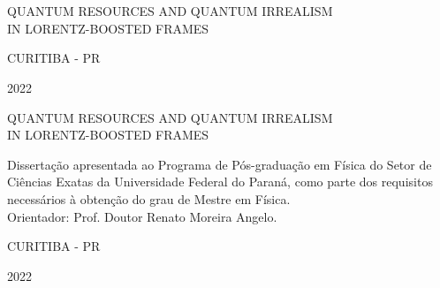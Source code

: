 \documentclass[12pt,a4paper,notitlepage]{report}
\begin{document}
\newcommand{\be}{\begin{eqnarray}}
\newcommand{\ee}{\end{eqnarray}}
\newcommand{\eq}[1]{\begin{align}#1\end{align}}
\newcommand{\Unit}{\mathbb{1}}
\newcommand{\Hop}{\mathcal{H}}
\newcommand{\sinc}{\mbox{ sinc}}
\newcommand{\overbar}[1]{\mkern 1.5mu\overline{\mkern-1.5mu#1\mkern-1.5mu}\mkern 1.5mu}

\begin{titlepage} %
\begin{center}
\vspace{2cm}
\\[.5cm]

\vspace{4cm}

\\[2cm]

\vspace{3.5cm}

QUANTUM RESOURCES AND QUANTUM IRREALISM \\[.2cm]
IN LORENTZ-BOOSTED FRAMES
\\[2.5cm]

\hfill

\vfill

CURITIBA - PR

2022

\end{center}
\end{titlepage}

\begin{titlepage} %
\begin{center}

\vspace{4cm}


\vspace{7cm}

QUANTUM RESOURCES AND QUANTUM IRREALISM \\[.2cm]
IN LORENTZ-BOOSTED FRAMES
\\[2.5cm]

\vspace{2cm}

\hspace{.45\textwidth} %
\begin{minipage}{.5\textwidth}
{\footnotesize Dissertação apresentada ao Programa de Pós-graduação em Física do 
Setor de Ciências Exatas da Universidade Federal do Paraná, 
como parte dos requisitos necessários à obtenção do grau de Mestre
em Física. \\[.5cm]
Orientador: Prof. Doutor Renato Moreira Angelo.}
\end{minipage}

\vfill

CURITIBA - PR

2022

\end{center}
\end{titlepage}
\end{document}
